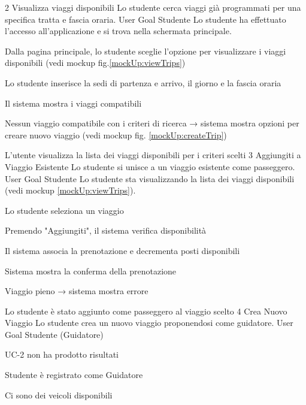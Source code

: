 \UseCase
{2}
{Visualizza viaggi disponibili}
{Lo studente cerca viaggi già programmati per una specifica tratta e fascia oraria.}
{User Goal}
{Studente}
{Lo studente ha effettuato l’accesso all’applicazione e si trova nella schermata principale.}
{\begin{description}[nosep]
    \item[1.] Dalla pagina principale, lo studente sceglie l'opzione per visualizzare i viaggi disponibili (vedi mockup fig.\ref{mockUp:viewTrips})
    \item[2.] Lo studente inserisce la sedi di partenza e arrivo, il giorno e la fascia oraria
    \item[3.] Il sistema mostra i viaggi compatibili
\end{description}}
{\begin{description}[nosep]
    \item[3a.] Nessun viaggio compatibile con i criteri di ricerca → sistema mostra opzioni per creare nuovo viaggio (vedi mockup fig. \ref{mockUp:createTrip})
\end{description}}
{L'utente visualizza la lista dei viaggi disponibili per i criteri scelti} 
\UseCase
{3}
{Aggiungiti a Viaggio Esistente}
{Lo studente si unisce a un viaggio esistente come passeggero.}
{User Goal}
{Studente}
{Lo studente sta visualizzando la lista dei viaggi disponibili (vedi mockup \ref{mockUp:viewTrips}).}
{\begin{description}[nosep]
    \item[1.] Lo studente seleziona un viaggio
    \item[2.] Premendo "Aggiungiti", il sistema verifica disponibilità
    \item[3.] Il sistema associa la prenotazione e decrementa posti disponibili
    \item[4.] Sistema mostra la conferma della prenotazione
\end{description}}
{\begin{description}[nosep]
    \item[2a.] Viaggio pieno → sistema mostra errore
\end{description}}
{Lo studente è stato aggiunto come passeggero al viaggio scelto}
\label{uc:uc3}
\UseCase
{4}
{Crea Nuovo Viaggio}
{Lo studente crea un nuovo viaggio proponendosi come guidatore.}
{User Goal}
{Studente (Guidatore)}
{\begin{description}[nosep]
    \item[-] UC-2 non ha prodotto risultati
    \item[-] Studente è registrato come Guidatore
    \item[-] Ci sono dei veicoli disponibili
\end{description}}

